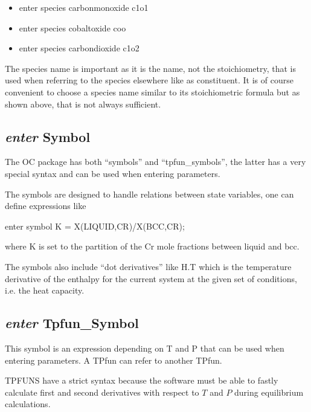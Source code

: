 \documentclass[12pt]{article}
\begin{document}
\begin{itemize}
\item enter species carbonmonoxide c1o1
\item enter species cobaltoxide coo
\item enter species carbondioxide c1o2
\end{itemize}

The species name is important as it is the name, not the
stoichiometry, that is used when referring to the species elsewhere
like as constituent.  It is of course convenient to choose a species
name similar to its stoichiometric formula but as shown above, that is
not always sufficient.

\subsection{{\em enter} Symbol}

The OC package has both ``symbols'' and ``tpfun\_symbols'', the latter
has a very special syntax and can be used when entering parameters.

The symbols are designed to handle relations between state variables,
one can define expressions like 

enter symbol K = X(LIQUID,CR)/X(BCC,CR);

where K is set to the partition of the Cr mole fractions between
liquid and bcc.

The symbols also include ``dot derivatives'' like H.T which is the
temperature derivative of the enthalpy for the current system at the
given set of conditions, i.e. the heat capacity.

\subsection{{\em enter} Tpfun\_Symbol}

This symbol is an expression depending on T and P that can be used
when entering parameters.  A TPfun can refer to another TPfun.

TPFUNS have a strict syntax because the software must be able to
fastly calculate first and second derivatives with respect to $T$ and
$P$ during equilibrium calculations.
\end{document}
